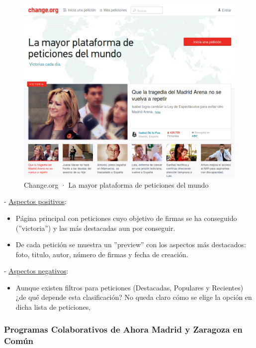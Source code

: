 \begin{figure}[H]
\centering
\includegraphics[keepaspectratio, scale=0.30]{Media/Captures/changeOrg.png}
\caption{Change.org · La mayor plataforma de peticiones del mundo}
\label{fig:changeOrg}
\end{figure}

 - \underline{Aspectos positivos}:

\begin{itemize}
	\item Página principal con peticiones cuyo objetivo de firmas se ha conseguido (''victoria'') y las más destacadas aun por conseguir.
	\item De cada petición se muestra un ''preview'' con los aspectos más destacados: foto, titulo, autor, número de firmas y fecha de creación.
\end{itemize}

 - \underline{Aspectos negativos}:

\begin{itemize}
	\item Aunque existen filtros para peticiones (Destacadas, Populares y Recientes) ¿de qué depende esta clasificación? No queda claro cómo se elige la opción en dicha lista de peticiones,
\end{itemize}

\subsubsection{Programas Colaborativos de Ahora Madrid y Zaragoza en Común}

